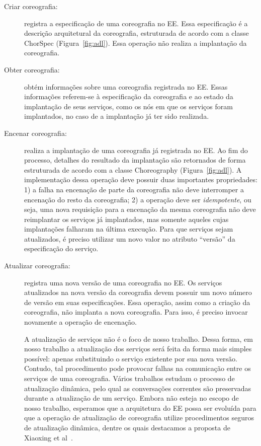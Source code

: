 \begin{description}

\item [Criar coreografia:] registra a especificação de uma coreografia no EE. 
Essa especificação é a descrição arquitetural da coreografia, 
estruturada de acordo com a classe \textsf{ChorSpec} (Figura~\ref{fig:adl}). 
Essa operação não realiza a implantação da coreografia.

\item [Obter coreografia:] obtém informações sobre uma coreografia registrada no EE. 
Essas informações referem-se à especificação da coreografia e ao estado da implantação 
de seus serviços, como os nós em que os serviços foram implantados, 
no caso de a implantação já ter sido realizada.

\item [Encenar coreografia:] realiza a implantação de uma coreografia já registrada no EE. 
Ao fim do processo, detalhes do resultado da implantação são retornados de forma estruturada 
de acordo com a classe \textsf{Choreography} (Figura~\ref{fig:adl}).
A implementação dessa operação deve possuir duas importantes propriedades: 
1) a falha na encenação de parte da coreografia não deve interromper a encenação do resto da coreografia; 
2) a operação deve ser \emph{idempotente}, ou seja, uma nova requisição para a encenação da mesma 
coreografia não deve reimplantar os serviços já implantados, 
mas somente aqueles cujas implantações falharam na última execução. 
Para que serviços sejam atualizados, é preciso utilizar um novo valor no atributo ``versão'' da especificação do serviço.

\item [Atualizar coreografia:] registra uma nova versão de uma coreografia no EE. 
Os serviços atualizados na nova versão da coreografia devem possuir 
um novo número de versão em suas especificações. 
Essa operação, assim como a criação da coreografia, não implanta a nova coreografia. 
Para isso, é preciso invocar novamente a operação de encenação.

A atualização de serviços não é o foco de nosso trabalho.
Dessa forma, em nosso trabalho a atualização dos serviços será feita da forma mais simples possível: 
apenas substituindo o serviço existente por sua nova versão. 
Contudo, tal procedimento pode provocar falhas na comunicação entre os serviços de uma coreografia. 
Vários trabalhos \cite{Kramer1990Philosophers, Vandewoude2007Tranquility, Xiaoxing2011VersionConsistent} 
estudam o processo de atualização dinâmica, pelo qual as conversações correntes 
são preservadas durante a atualização de um serviço. 
Embora não esteja no escopo de nosso trabalho, esperamos que a arquitetura do EE possa ser 
evoluída para que a operação de atualização de coreografia utilize procedimentos seguros de 
atualização dinâmica, dentre os quais destacamos a proposta de Xiaoxing et al~\cite{Xiaoxing2011VersionConsistent}.

\end{description}

